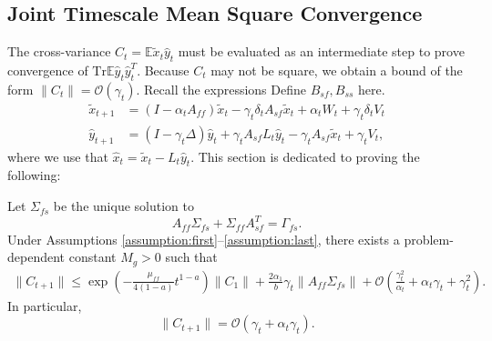 \subsection{Joint Timescale Mean Square Convergence}\label{sec:joint_mse}
The cross-variance $C_t = \mathbb{E} \tilde{x}_t \hat{y}_t$ must be evaluated as an intermediate step to prove convergence of $\mathrm{Tr} \mathbb{E} \hat{y}_t \hat{y}_t^T$.
Because $C_t$ may not be square, we obtain a bound of the form $\lVert C_t \rVert = \mathcal{O}(\gamma_t)$.
Recall the expressions {\color{red}Define $B_{sf}, B_{ss}$ here.}
\begin{align*}
    \tilde{x}_{t+1} &= (I - \alpha_t A_{ff}) \tilde{x}_t - \gamma_t \delta_t A_{sf} \tilde{x}_t + \alpha_t W_t + \gamma_t \delta_t V_t \\ 
    \hat{y}_{t+1} &= (I - \gamma_t \Delta) \hat{y}_t + \gamma_t A_{sf} L_t \hat{y}_t - \gamma_t A_{sf} \tilde{x}_t + \gamma_t V_t ,
\end{align*}
where we use that $\hat{x}_t = \tilde{x}_t - L_t \hat{y}_t$. 
This section is dedicated to proving the following:
\begin{lemma}\label{lem:joint_mse}
    Let $\Sigma_{fs}$ be the unique solution to
    \begin{equation}\label{eq:joint_covariance}
        A_{ff} \Sigma_{fs} + \Sigma_{ff} A_{sf}^T = \Gamma_{fs} .
    \end{equation}
    Under Assumptions \ref{assumption:first}--\ref{assumption:last}, there exists a problem-dependent constant $M_g > 0$ such that
    \begin{align*}
    \lVert C_{t+1} \rVert \leq \exp \left(- \frac{\mu_{ff}}{4 (1-a)} t^{1-a}\right) \lVert C_1 \rVert 
    + \frac{2 \alpha_1}{b} \gamma_t \lVert A_{ff} \Sigma_{fs} \rVert 
    + \mathcal{O}\left(\frac{\gamma_t^2}{\alpha_t} + \alpha_t \gamma_t + \gamma_t^2 \right) .
    \end{align*}
    In particular, 
    \begin{equation}
        \lVert C_{t+1} \rVert = \mathcal{O}\left(\gamma_t + \alpha_t \gamma_t\right) .
    \end{equation}
\end{lemma}

